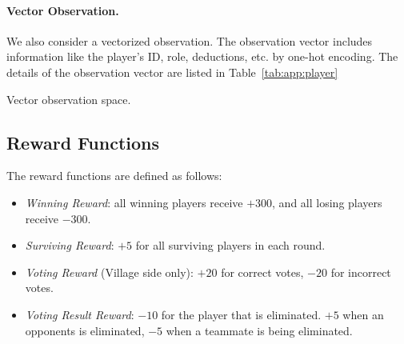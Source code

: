 \paragraph{Vector Observation.}
We also consider a vectorized observation. The observation vector includes information like the player's ID, role, deductions, etc. by one-hot encoding. The details of the observation vector are listed in Table~\ref{tab:app:player}

\begin{table}[H]
\centering

\caption{Vector observation space.}
\label{tab:app:player}
\end{table}

\subsection{Reward Functions}

The reward functions are defined as follows:
\begin{itemize}
    \item \textit{Winning Reward}: all winning players receive $+300$, and all losing players receive $-300$.
    \item \textit{Surviving Reward}: $+5$ for all surviving players in each round.
    \item \textit{Voting Reward} (Village side only): $+20$ for correct votes, $-20$ for incorrect votes.
    \item \textit{Voting Result Reward}: $-10$ for the player that is eliminated. $+5$ when an opponents is eliminated, $-5$ when a teammate is being eliminated.
\end{itemize}
